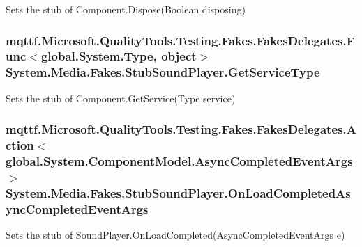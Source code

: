 Sets the stub of Component.\-Dispose(\-Boolean disposing)

\hypertarget{class_system_1_1_media_1_1_fakes_1_1_stub_sound_player_ad4509025dea12a799a675b0ebe8c79a8}{
\subsubsection[{Get\-Service\-Type}]{\setlength{\rightskip}{0pt plus 5cm}mqttf.\-Microsoft.\-Quality\-Tools.\-Testing.\-Fakes.\-Fakes\-Delegates.\-Func$<$global.\-System.\-Type, object$>$ System.\-Media.\-Fakes.\-Stub\-Sound\-Player.\-Get\-Service\-Type}}\label{class_system_1_1_media_1_1_fakes_1_1_stub_sound_player_ad4509025dea12a799a675b0ebe8c79a8}


Sets the stub of Component.\-Get\-Service(\-Type service)

\hypertarget{class_system_1_1_media_1_1_fakes_1_1_stub_sound_player_a468c97862a75c0b12aaaff9e5e272bb8}{
\subsubsection[{On\-Load\-Completed\-Async\-Completed\-Event\-Args}]{\setlength{\rightskip}{0pt plus 5cm}mqttf.\-Microsoft.\-Quality\-Tools.\-Testing.\-Fakes.\-Fakes\-Delegates.\-Action$<$global.\-System.\-Component\-Model.\-Async\-Completed\-Event\-Args$>$ System.\-Media.\-Fakes.\-Stub\-Sound\-Player.\-On\-Load\-Completed\-Async\-Completed\-Event\-Args}}\label{class_system_1_1_media_1_1_fakes_1_1_stub_sound_player_a468c97862a75c0b12aaaff9e5e272bb8}


Sets the stub of Sound\-Player.\-On\-Load\-Completed(\-Async\-Completed\-Event\-Args e)

